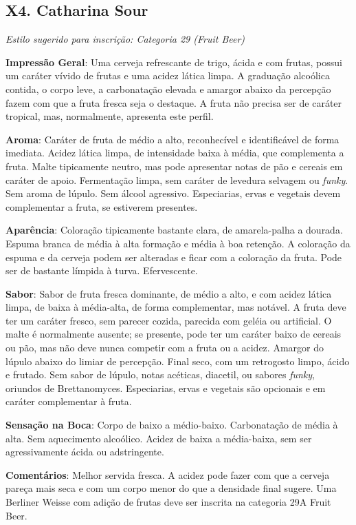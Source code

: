 \subsection*{X4. Catharina Sour}

\textit{Estilo sugerido para inscrição: Categoria 29 (Fruit Beer)}

\textbf{Impressão Geral}: Uma cerveja refrescante de trigo, ácida e com frutas, possui um caráter vívido de frutas e uma acidez lática limpa. A graduação alcoólica contida, o corpo leve, a carbonatação elevada e amargor abaixo da percepção fazem com que a fruta fresca seja o destaque. A fruta não precisa ser de caráter tropical, mas, normalmente, apresenta este perfil.

\textbf{Aroma}: Caráter de fruta de médio a alto, reconhecível e identificável de forma imediata. Acidez lática limpa, de intensidade baixa à média, que complementa a fruta. Malte tipicamente neutro, mas pode apresentar notas de pão e cereais em caráter de apoio. Fermentação limpa, sem caráter de levedura selvagem ou \textit{funky}. Sem aroma de lúpulo. Sem álcool agressivo. Especiarias, ervas e vegetais devem complementar a fruta, se estiverem presentes.

\textbf{Aparência}: Coloração tipicamente bastante clara, de amarela-palha a dourada. Espuma branca de média à alta formação e média à boa retenção. A coloração da espuma e da cerveja podem ser alteradas e ficar com a coloração da fruta. Pode ser de bastante límpida à turva. Efervescente.

\textbf{Sabor}: Sabor de fruta fresca dominante, de médio a alto, e com acidez lática limpa, de baixa à média-alta, de forma complementar, mas notável. A fruta deve ter um caráter fresco, sem parecer cozida, parecida com geléia ou artificial. O malte é normalmente ausente; se presente, pode ter um caráter baixo de cereais ou pão, mas não deve nunca competir com a fruta ou a acidez. Amargor do lúpulo abaixo do limiar de percepção. Final seco, com um retrogosto limpo, ácido e frutado. Sem sabor de lúpulo, notas acéticas, diacetil, ou sabores \textit{funky}, oriundos de Brettanomyces. Especiarias, ervas e vegetais são opcionais e em caráter complementar à fruta.

\textbf{Sensação na Boca}: Corpo de baixo a médio-baixo. Carbonatação de média à alta. Sem aquecimento alcoólico. Acidez de baixa a média-baixa, sem ser agressivamente ácida ou adstringente.

\textbf{Comentários}: Melhor servida fresca. A acidez pode fazer com que a cerveja pareça mais seca e com um corpo menor do que a densidade final sugere. Uma Berliner Weisse com adição de frutas deve ser inscrita na categoria 29A Fruit Beer.

